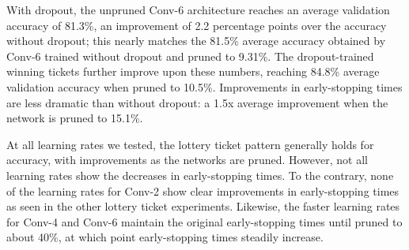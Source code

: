 With dropout, the unpruned Conv-6 architecture reaches an average validation
accuracy of 81.3\%, an improvement of 2.2 percentage points over the accuracy without dropout;
this nearly matches the 81.5\% average accuracy obtained by Conv-6 trained without dropout and pruned to 9.31\%. The dropout-trained winning tickets
further improve upon these numbers, reaching 84.8\% average validation accuracy when pruned to 10.5\%.  Improvements in early-stopping times are less
dramatic than without dropout: a 1.5x average improvement when the network is pruned to 15.1\%.

At all learning rates we tested, the lottery ticket pattern generally holds for accuracy, with improvements as the networks are pruned. However,
not all learning rates show the decreases in early-stopping times. To the contrary, none of the learning rates for Conv-2 show clear improvements in early-stopping
times as seen in the other lottery ticket experiments. Likewise, the faster learning rates for Conv-4 and Conv-6 maintain the original early-stopping times until pruned
to about 40\%, at which point early-stopping times steadily increase.



